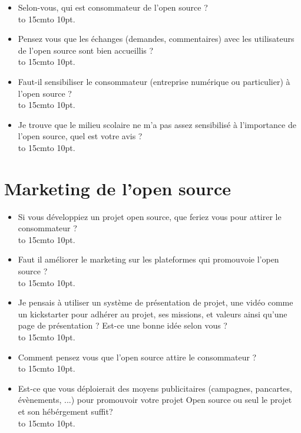 \begin{itemize}[label=\textbullet, font=\LARGE \color{burntorange}]
	\item Selon-vous, qui est consommateur de l'open source ?\\
	\hbox to 15cm{\leaders\hbox to 10pt{\hss . \hss}\hfil}
	\item Pensez vous que les échanges (demandes, commentaires) avec les utilisateurs de l'open source sont bien accueillis ?\\
	\hbox to 15cm{\leaders\hbox to 10pt{\hss . \hss}\hfil}
	\item Faut-il sensibiliser le consommateur (entreprise numérique ou particulier) à l'open source ?\\
	\hbox to 15cm{\leaders\hbox to 10pt{\hss . \hss}\hfil}
	\item Je trouve que le milieu scolaire ne m'a pas assez sensibilisé à l'importance de l'open source, quel est votre avis ?\\
	\hbox to 15cm{\leaders\hbox to 10pt{\hss . \hss}\hfil}
\end{itemize}

\section*{Marketing de l'open source}

\begin{itemize}[label=\textbullet, font=\LARGE \color{burntorange}]
	\item Si vous développiez un projet open source, que feriez vous pour attirer le consommateur ?\\
	\hbox to 15cm{\leaders\hbox to 10pt{\hss . \hss}\hfil}
	\item Faut il améliorer le marketing sur les plateformes qui promouvoie l'open source ?\\
	\hbox to 15cm{\leaders\hbox to 10pt{\hss . \hss}\hfil}
	\item Je pensais à utiliser un système de présentation de projet, une vidéo comme un kickstarter pour adhérer au projet, ses missions, et valeurs ainsi qu'une page de présentation ? Est-ce une bonne idée selon vous ?\\
	\hbox to 15cm{\leaders\hbox to 10pt{\hss . \hss}\hfil}
	\item Comment pensez vous que l'open source attire le consommateur ?\\
	\hbox to 15cm{\leaders\hbox to 10pt{\hss . \hss}\hfil}
	\item Est-ce que vous déploierait des moyens publicitaires (campagnes, pancartes, évènements, ...) pour promouvoir votre projet Open source ou seul le projet et son hébérgement suffit?\\
	\hbox to 15cm{\leaders\hbox to 10pt{\hss . \hss}\hfil}
\end{itemize}